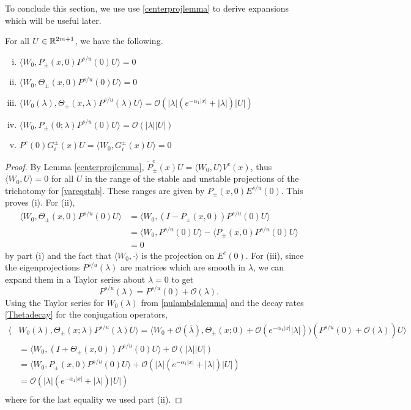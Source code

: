 \documentclass[thesis.tex]{subfiles}
\begin{document}
To conclude this section, we use use \cref{centerprojlemma} to derive expansions which will be useful later.

\begin{lemma}\label{W0projlemma}
For all $U \in \mathbb{R}^{2m+1}$, we have the following.
\begin{enumerate}[(i)]
	\item $\langle W_0, P_\pm(x, 0) P^{s/u}(0) U \rangle = 0$
	\item $\langle W_0, \Theta_\pm(x, 0) P^{s/u}(0) U \rangle = 0$
	\item $\langle W_0(\lambda), \Theta_\pm(x, \lambda) P^{s/u}(\lambda) U \rangle  = \mathcal{O}(|\lambda|( e^{-\alpha_1 |x|} + |\lambda|)|U|)$
	\item $\langle W_0, P_\pm(0; \lambda) P^{s/u}(0) U \rangle = \mathcal{O}(|\lambda||U|)$
	\item $P^c(0) G_i^\pm(x) U = \langle W_0, G_i^\pm(x) U\rangle = 0$
\end{enumerate}
\begin{proof}
By Lemma \ref{centerprojlemma}, $\tilde{P}_\pm^c(x)U = \langle W_0, U \rangle V^c(x)$, thus $\langle W_0, U \rangle = 0$ for all $U$ in the range of the stable and unstable projections of the trichotomy for \cref{vareqstab}. These ranges are given by $P_\pm(x, 0) E^{s/u}(0)$. This proves (i). For (ii), 
\begin{align*}
\langle W_0, \Theta_\pm(x, 0) P^{s/u}(0) U\rangle &=
\langle W_0, (I - P_\pm(x, 0)) P^{s/u}(0) U\rangle \\
&= \langle W_0, P^{s/u}(0) U \rangle - \langle P_\pm(x, 0)P^{s/u}(0) U \rangle \\
&= 0
\end{align*}
by part (i) and the fact that $\langle W_0, \cdot \rangle$ is the projection on $E^c(0)$. For (iii), since the eigenprojections $P^{s/u}(\lambda)$ are matrices which are smooth in $\lambda$, we can expand them in a Taylor series about $\lambda = 0$ to get 
\[
P^{s/u}(\lambda) = P^{s/u}(0) + \mathcal{O}(\lambda).
\] 
Using the Taylor series for $W_0(\lambda)$ from \cref{nulambdalemma} and the decay rates \cref{Thetadecay} for the conjugation operators,
\begin{align*}
\langle &W_0(\lambda), \Theta_\pm(x; \lambda) P^{s/u}(\lambda) U \rangle = \langle W_0 + \mathcal{O}(\overline{\lambda}), \Theta_\pm(x; 0) + \mathcal{O}(e^{-\alpha_1 |x|}|\lambda|))(P^{s/u}(0) + \mathcal{O}(\lambda)) U \rangle \\
&= \langle W_0, (I + \Theta_\pm(x, 0))P^{s/u}(0)U \rangle +
\mathcal{O}(|\lambda||U|) \\
&= \langle W_0, P_\pm(x, 0)P^{s/u}(0)U \rangle +
\mathcal{O}(|\lambda|( e^{-\alpha_1 |x|} + |\lambda|)|U|)\\
&= \mathcal{O}(|\lambda|( e^{-\alpha_1 |x|} + |\lambda|)|U|) \\
\end{align*}
where for the last equality we used part (ii). 


\end{proof}
\end{lemma}
\end{document}
